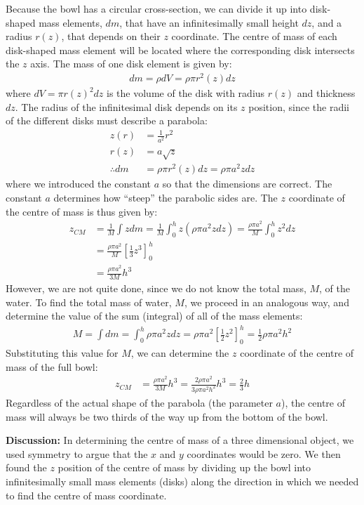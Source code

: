 \begin{example}
Because the bowl has a circular cross-section, we can divide it up into disk-shaped mass elements, $dm$, that have an infinitesimally small height $dz$, and a radius $r(z)$, that depends on their $z$ coordinate. The centre of mass of each disk-shaped mass element will be located where the corresponding disk intersects the $z$ axis. The mass of one disk element is given by:
\begin{align*}
dm = \rho dV = \rho \pi r^2(z) dz
\end{align*}
where $dV = \pi r(z)^2 dz$ is the volume of the disk with radius $r(z)$ and thickness $dz$. The radius of the infinitesimal disk depends on its $z$ position, since the radii of the different disks must describe a parabola:
\begin{align*}
z(r) &= \frac{1}{a^2}r^2\\
r(z) &= a\sqrt z\\
\therefore dm &= \rho \pi r^2(z) dz= \rho \pi a^2  z dz
\end{align*}
where we introduced the constant $a$ so that the dimensions are correct. The constant $a$ determines how ``steep'' the parabolic sides are. The $z$ coordinate of the centre of mass is thus given by:
\begin{align*}
z_{CM} &=  \frac{1}{M}\int z dm =\frac{1}{M}\int_0^h z  (\rho \pi a^2 z dz)=\frac{\rho \pi a^2}{M}\int_0^h z^2dz \\
&=\frac{\rho \pi a^2}{M}\left[ \frac{1}{3}z^3 \right]_0^h\\
&=\frac{\rho \pi a^2}{3M}h^3
\end{align*}
However, we are not quite done, since we do not know the total mass, $M$, of the water. To find the total mass of water, $M$, we proceed in an analogous way, and determine the value of the sum (integral) of all of the mass elements:
\begin{align*}
M = \int dm = \int_0^h \rho \pi a^2 z dz = \rho \pi a^2 \left[ \frac{1}{2}z^2 \right]_0^h= \frac{1}{2}\rho \pi a^2 h^2
\end{align*}
Substituting this value for $M$, we can determine the $z$ coordinate of the centre of mass of the full bowl:
\begin{align*}
z_{CM} &=\frac{\rho \pi a^2}{3M}h^3 = \frac{2\rho \pi a^2}{3\rho \pi a^2 h^2}h^3=\frac{2}{3}h
\end{align*}
Regardless of the actual shape of the parabola (the parameter $a$), the centre of mass will always be two thirds of the way up from the bottom of the bowl.

\textbf{Discussion: }In determining the centre of mass of a three dimensional object, we used symmetry to argue that the $x$ and $y$ coordinates would be zero. We then found the $z$ position of the centre of mass by dividing up the bowl into infinitesimally small mass elements (disks) along the direction in which we needed to find the centre of mass coordinate.
\end{example}


